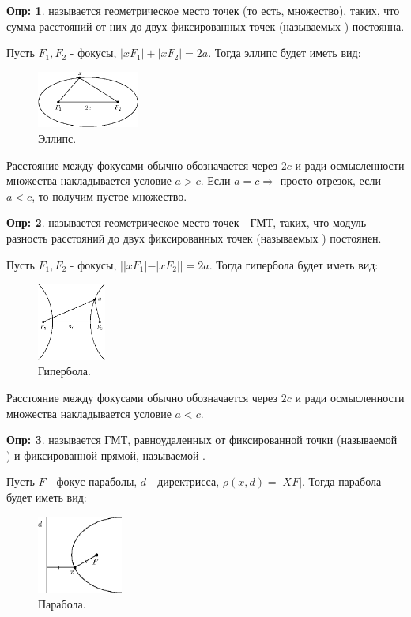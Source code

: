\documentclass[12pt]{article}
\theoremstyle{definition}
\newtheorem{defn}{Опр:}
\begin{document}
\begin{defn}
	 называется геометрическое место точек (то есть, множество), таких, что сумма расстояний от них до двух фиксированных точек (называемых ) постоянна.
\end{defn}
Пусть $F_1, F_2$ - фокусы, $|xF_1| + |xF_2| = 2a$. Тогда эллипс будет иметь вид:
\begin{figure}[H]
	\centering
	\includegraphics[width=0.3\textwidth]{ANGL1_2.eps}
	\caption{Эллипс.}
	\label{1_2}
\end{figure}
Расстояние между фокусами обычно обозначается через $2c$ и ради осмысленности множества накладывается условие $a > c$. Если $a = c \Rightarrow$ просто отрезок, если $a < c$, то получим пустое множество.
\begin{defn}
	 называется геометрическое место точек - ГМТ, таких, что модуль разность расстояний до двух фиксированных точек (называемых ) постоянен.
\end{defn}
Пусть $F_1, F_2$ - фокусы, $||xF_1| - |xF_2|| = 2a$. Тогда гипербола будет иметь вид:
\begin{figure}[H]
	\centering
	\includegraphics[width=0.2\textwidth]{ANGL1_3.eps}
	\caption{Гипербола.}
	\label{1_3}
\end{figure}
Расстояние между фокусами обычно обозначается через $2c$ и ради осмысленности множества накладывается условие $a < c$.
\begin{defn}
	 называется ГМТ, равноудаленных от фиксированной точки (называемой ) и фиксированной прямой, называемой . 
\end{defn}
Пусть $F$ - фокус параболы, $d$ - директрисса, $\rho(x,d) = |XF|$. Тогда парабола будет иметь вид:
\begin{figure}[H]
	\centering
	\includegraphics[width=0.25\textwidth]{ANGL1_4.eps}
	\caption{Парабола.}
	\label{1_4}
\end{figure}
\end{document}
